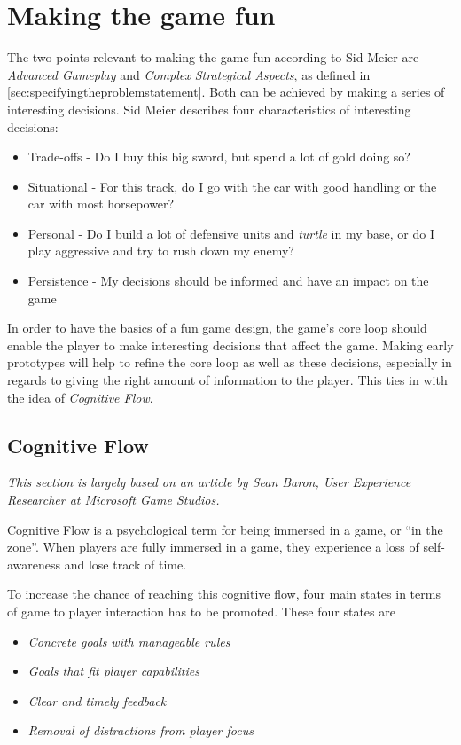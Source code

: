 \section{Making the game fun}
The two points relevant to making the game fun according to Sid Meier\cite{GDC2012} are \textit{Advanced Gameplay} and \textit{Complex Strategical Aspects}, as defined in \ref{sec:specifyingtheproblemstatement}.
Both can be achieved by making a series of interesting decisions.
Sid Meier describes four characteristics of interesting decisions:\cite{GDC2012}
\begin{itemize}
	\item Trade-offs - Do I buy this big sword, but spend a lot of gold doing so?
	\item Situational - For this track, do I go with the car with good handling or the car with most horsepower?
	\item Personal - Do I build a lot of defensive units and \textit{turtle} in my base, or do I play aggressive and try to rush down my enemy?
	\item Persistence - My decisions should be informed and have an impact on the game
\end{itemize}

In order to have the basics of a fun game design, the game's core loop should enable the player to make interesting decisions that affect the game.
Making early prototypes will help to refine the core loop as well as these decisions, especially in regards to giving the right amount of information to the player.
This ties in with the idea of \textit{Cognitive Flow}.

\subsection{Cognitive Flow}
\emph{This section is largely based on an article by Sean Baron, User Experience Researcher at Microsoft Game
Studios\cite{baron}.}

Cognitive Flow is a psychological term for being immersed in a game, or ``in the zone''.
When players are fully immersed in a game, they experience a loss of self-awareness and lose track of time.

To increase the chance of reaching this cognitive flow, four main states in terms of game to player interaction has to
be promoted.  
These four states are 
\begin{itemize}
    \item \emph{Concrete goals with manageable rules}
    \item \emph{Goals that fit player capabilities}
    \item \emph{Clear and timely feedback}
    \item \emph{Removal of distractions from player focus}
\end{itemize}

